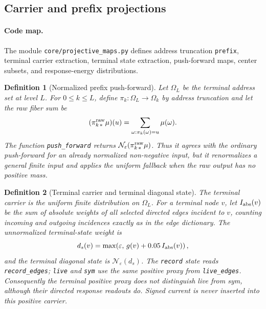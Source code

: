 \documentclass[11pt]{article}
\newtheorem{definition}{Definition}[section]
\theoremstyle{remark}
\newcommand{\code}[1]{\texttt{#1}}
\numberwithin{equation}{section}
\begin{document}
\subsection{Carrier and prefix projections}
\paragraph{Code map.} The module \code{core/projective\_\allowbreak{}maps.py} defines address truncation \code{prefix}, terminal carrier extraction, terminal state extraction, push-forward maps, center subsets, and response-energy distributions.

\begin{definition}[Normalized prefix push-forward]
Let \(\Omega_L\) be the terminal address set at level \(L\). For \(0\le k\le L\), define \(\pi_k:\Omega_L\to\Omega_k\) by address truncation and let the raw fiber sum be
\begin{equation}
  (\pi_{k\,*}^{\rm raw}\mu)(u)=\sum_{\omega:\pi_k(\omega)=u}\mu(\omega).
  \label{eq:terminal-prefix-pushforward}
\end{equation}
The function \code{push\_\allowbreak{}forward} returns \(\mathcal N_{\varepsilon}(\pi_{k\,*}^{\rm raw}\mu)\). Thus it agrees with the ordinary push-forward for an already normalized non-negative input, but it renormalizes a general finite input and applies the uniform fallback when the raw output has no positive mass.
\end{definition}

\begin{definition}[Terminal carrier and terminal diagonal state]
The terminal carrier is the uniform finite distribution on \(\Omega_L\). For a terminal node \(v\), let \(I_{\rm abs}(v)\) be the sum of absolute weights of all selected directed edges incident to \(v\), counting incoming and outgoing incidences exactly as in the edge dictionary. The unnormalized terminal-state weight is
\[
  d_s(v)=\max\!\left(\varepsilon,\,g(v)+0.05\,I_{\rm abs}(v)\right),
\]
and the terminal diagonal state is \(\mathcal N_{\varepsilon}(d_s)\). The \code{record} state reads \code{record\_edges}; \code{live} and \code{sym} use the same positive proxy from \code{live\_edges}. Consequently the terminal positive proxy does not distinguish live from sym, although their directed response readouts do. Signed current is never inserted into this positive carrier.
\end{definition}
\end{document}

